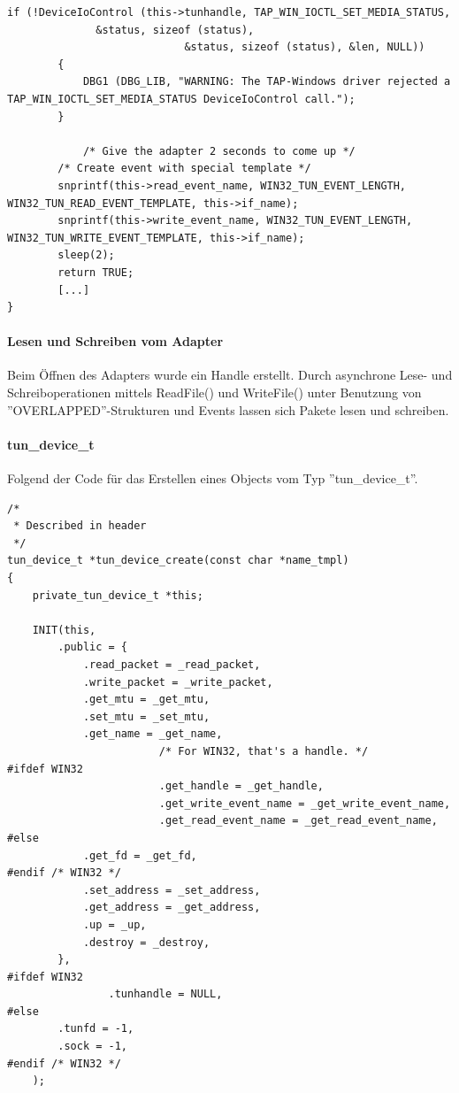 {\begin{lstlisting}[caption=Konfiguration eines TAP-Geräts]
        if (!DeviceIoControl (this->tunhandle, TAP_WIN_IOCTL_SET_MEDIA_STATUS,
  			  &status, sizeof (status),
                            &status, sizeof (status), &len, NULL))
        {
            DBG1 (DBG_LIB, "WARNING: The TAP-Windows driver rejected a TAP_WIN_IOCTL_SET_MEDIA_STATUS DeviceIoControl call.");
        }

            /* Give the adapter 2 seconds to come up */
        /* Create event with special template */
        snprintf(this->read_event_name, WIN32_TUN_EVENT_LENGTH, WIN32_TUN_READ_EVENT_TEMPLATE, this->if_name);
        snprintf(this->write_event_name, WIN32_TUN_EVENT_LENGTH, WIN32_TUN_WRITE_EVENT_TEMPLATE, this->if_name);
        sleep(2);
        return TRUE;
        [...]
}
\end{lstlisting}

\paragraph{Lesen und Schreiben vom Adapter}
Beim Öffnen des Adapters wurde ein Handle erstellt.
Durch asynchrone Lese- und Schreiboperationen mittels ReadFile() und WriteFile()
unter Benutzung von ''OVERLAPPED''-Strukturen und Events lassen sich Pakete
lesen und schreiben.

\paragraph{tun\_device\_t}
Folgend der Code für das Erstellen eines Objects vom Typ ''tun\_device\_t''.

\begin{lstlisting}[caption=Code für das Erstellen von tun\_device\_t]
/*
 * Described in header
 */
tun_device_t *tun_device_create(const char *name_tmpl)
{
	private_tun_device_t *this;

	INIT(this,
		.public = {
			.read_packet = _read_packet,
			.write_packet = _write_packet,
			.get_mtu = _get_mtu,
			.set_mtu = _set_mtu,
			.get_name = _get_name,
                        /* For WIN32, that's a handle. */
#ifdef WIN32
                        .get_handle = _get_handle,
                        .get_write_event_name = _get_write_event_name,
                        .get_read_event_name = _get_read_event_name,
#else
			.get_fd = _get_fd,
#endif /* WIN32 */
			.set_address = _set_address,
			.get_address = _get_address,
			.up = _up,
			.destroy = _destroy,
		},
#ifdef WIN32
                .tunhandle = NULL,
#else
		.tunfd = -1,
		.sock = -1,
#endif /* WIN32 */
	);


\end{lstlisting}}
